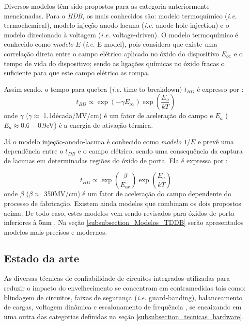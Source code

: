 Diversos modelos têm sido propostos para as categoria anteriormente mencionadas. Para o \textit{HDB}, os mais conhecidos são: modelo termoquímico (\textit{i.e.} termochemical), modelo injeção-anodo-lacuna (\textit{i.e.} anode-hole-injection) e o modelo direcionado à voltagem (\textit{i.e.} voltage-driven).
O modelo termoquímico é conhecido como \textit{modelo} $E$ (\textit{i.e.} E model), pois considera que existe uma correlação direta entre o campo elétrico aplicado no óxido do dispositivo $E_{ox}$ e o tempo de vida do dispositivo; sendo as ligações químicas no óxido fracas o suficiente para que este campo elétrico as rompa.

Assim sendo, o tempo para quebra (\textit{i.e.} time to breakdown) $t_{BD}$ é expresso por \cite{McPherson1985}:
\begin{equation} \label{eq:TDDB_time_to_break_Emodel}
t_{BD}\propto \exp\left(-\gamma E_{ox}\right)\exp\left(\frac{E_{a}}{kT} \right)
\end{equation}
onde $\gamma$ ($\gamma\approx$ 1.1década/MV/cm) é um fator de aceleração do campo e $E_a$ ($E_a\approx 0.6 - 0.9$eV) é a energia de ativação térmica.

Já o modelo injeção-anodo-lacuna é conhecido como \textit{modelo} $1/E$ e prevê uma dependência entre o $t_{DB}$ e o campo elétrico, sendo uma consequência da captura de lacunas em determinadas regiões do óxido de porta. Ela é expressa por \cite{ChenmingHu1985}:

\begin{equation} \label{eq:TDDB_time_to_break_1/Emodel}
t_{BD}\propto \exp\left(\frac{\beta}{E_{ox}}\right)\exp\left(\frac{E_{a}}{kT} \right)
\end{equation}
onde $\beta$ ($\beta\approx$ 350MV/cm) é um fator de aceleração do campo dependente do processo de fabricação.
Existem ainda modelos que combinam os dois propostos acima. De todo caso, estes modelos vem sendo revisados para óxidos de porta inferiores à 5nm \cite{Maricau2013}.
Na seção \ref{subsubsection_Modelos_TDDB} serão apresentados modelos mais precisos e modernos.

\subsection{Estado da arte}
\label{subsection_estado_da_arte}
As diversas técnicas de confiabilidade de circuitos integrados utilizadas para reduzir o impacto do envelhecimento se concentram em contramedidas tais como: blindagem de circuitos, faixas de segurança (\textit{i.e.} guard-banding), balanceamento de cargas, voltagem dinâmica e escalonamento de frequência \cite{Mintarno2010}\cite{Mitra2011}, se encaixando em uma outra das categorias definidas na seção \ref{subsubsection_tecnicas_hardware}.

